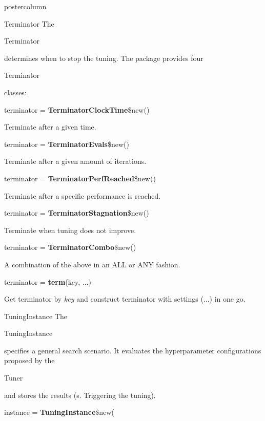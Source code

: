 \documentclass{beamer}
\newlength{\columnheight} %
\newcommand{\codeinline}[1]{\begin{codeboxinline}#1\end{codeboxinline}}
\begin{document}
\begin{frame}[fragile]{}
\begin{columns}
\begin{column}{.245\textwidth}
\begin{beamercolorbox}[center]{postercolumn}
				\begin{minipage}{.98\textwidth}
					\parbox[t][\columnheight]{\textwidth}{
						\begin{myblock}{Terminator}
							The \codeinline{Terminator} determines when to stop the tuning. The package provides four \codeinline{Terminator} classes:
							\\
							\begin{codebox}
								terminator = \textbf{TerminatorClockTime}\$new()
							\end{codebox}
							Terminate after a given time.
							\\
							\begin{codebox}
								terminator = \textbf{TerminatorEvals}\$new()
							\end{codebox}
							Terminate after a given amount of iterations.
							\\
							\begin{codebox}
								terminator = \textbf{TerminatorPerfReached}\$new()
							\end{codebox}
							Terminate after a specific performance is reached.
							\\
							\begin{codebox}
								terminator = \textbf{TerminatorStagnation}\$new()
							\end{codebox}
							Terminate when tuning does not improve.
							\\
							\begin{codebox}
								terminator = \textbf{TerminatorCombo}\$new()
							\end{codebox}
							A combination of the above in an ALL or ANY fashion.
							\\
							\begin{codebox}
								terminator = \textbf{term}(key, ...)
							\end{codebox}
							Get terminator by \textit{key} and construct terminator with settings (...) in one go.
						\end{myblock}
						\begin{myblock}{TuningInstance}
							The \codeinline{TuningInstance} specifies a general search scenario. It evaluates the hyperparameter configurations proposed by the \codeinline{Tuner} and stores the results (s. Triggering the tuning).
							\\
							\begin{codeboxmultiline}[width=18cm]
								instance = \textbf{TuningInstance}\$new(\\

\end{codeboxmultiline}
\end{myblock}}
\end{minipage}
\end{beamercolorbox}
\end{column}
\end{columns}
\end{frame}
\end{document}

